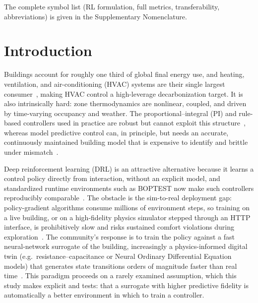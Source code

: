 \documentclass[a4paper,fleqn]{cas-sc}
\begin{document}
{\footnotesize\noindent The complete symbol list (RL formulation, full metrics, transferability, abbreviations) is given in the Supplementary Nomenclature.\par}

\setcounter{table}{0}

\section{Introduction}

Buildings account for roughly one third of global final energy use, and heating, ventilation, and air-conditioning (HVAC) systems are their single largest consumer~\citep{AlSayed2024Review,Nguyen2024Modelling}, making HVAC control a high-leverage decarbonization target. It is also intrinsically hard: zone thermodynamics are nonlinear, coupled, and driven by time-varying occupancy and weather. The proportional--integral (PI) and rule-based controllers used in practice are robust but cannot exploit this structure~\citep{Savino2025ASHRAE,Gao2024Predictive}, whereas model predictive control can, in principle, but needs an accurate, continuously maintained building model that is expensive to identify and brittle under mismatch~\citep{Hou2024MultiSource}.

Deep reinforcement learning (DRL) is an attractive alternative because it learns a control policy directly from interaction, without an explicit model, and standardized runtime environments such as BOPTEST now make such controllers reproducibly comparable~\citep{Blum2021BOPTEST,AlSayed2024Review}. The obstacle is the sim-to-real deployment gap: policy-gradient algorithms consume millions of environment steps, so training on a live building, or on a high-fidelity physics simulator stepped through an HTTP interface, is prohibitively slow and risks sustained comfort violations during exploration~\citep{Wang2025SafeDRL,Hou2024MultiSource}. The community's response is to train the policy against a fast neural-network surrogate of the building, increasingly a physics-informed digital twin (e.g.\ resistance--capacitance or Neural Ordinary Differential Equation models) that generates state transitions orders of magnitude faster than real time~\citep{HouEvins2024,Mshragi2026FastML}. This paradigm proceeds on a rarely examined assumption, which this study makes explicit and tests: that a surrogate with higher predictive fidelity is automatically a better environment in which to train a controller.
\end{document}

